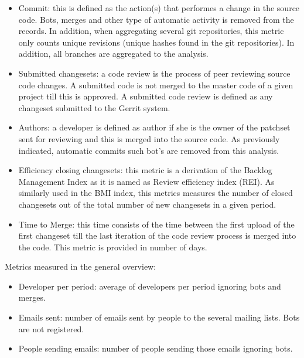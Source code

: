 \documentclass[a4wide,11pt]{report}
\begin{document}
\begin{itemize}
\item Commit: this is defined as the action(s) that performes a change in the source code. 
Bots, merges and other type of automatic activity is removed from the records. In addition,
when aggregating several git repositories, this metric only counts unique revisions (unique hashes found in the git repositories).
In addition, all branches are aggregated to the analysis.

\item Submitted changesets: a code review is the process of peer reviewing source code changes. A submitted code
is not merged to the master code of a given project till this is approved.
A submitted code review is defined as any changeset submitted to the Gerrit
system. 
 
\item Authors: a developer is defined as author if she is the owner of the patchset sent for reviewing and this is 
merged into the source code. As previously indicated, automatic commits such bot's are removed from this analysis.

\item Efficiency closing changesets: this metric is a derivation of the Backlog Management Index as it is named as
Review efficiency index (REI). As similarly used in the BMI index, this metrics measures the number of closed changesets
 out of the total number of new changesets in a given period.

\item Time to Merge: this time consists of the time between the first upload of the first changeset
till the last iteration of the code review process is merged into the code.
This metric is provided in number of days.


\end{itemize}


Metrics measured in the general overview:

\begin{itemize}
\item Developer per period: average of developers per period ignoring bots and merges.

\item Emails sent: number of emails sent by people to the several mailing lists. Bots are not registered.

\item People sending emails: number of people sending those emails ignoring bots.

\end{itemize}
\end{document}
